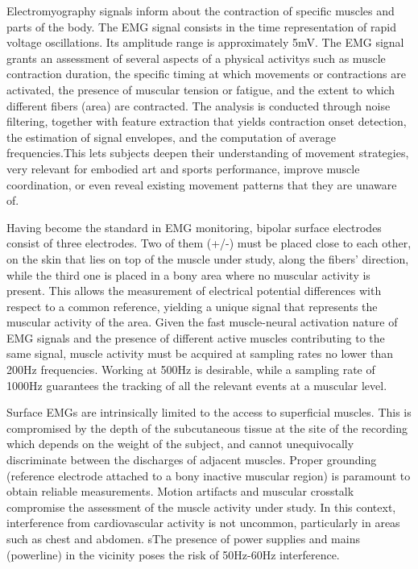 Electromyography signals inform about the contraction of specific muscles and parts of the body. The EMG signal consists in the time representation of rapid voltage oscillations. Its amplitude range is approximately 5mV. The EMG signal grants an assessment of several aspects of a physical activitys such as muscle contraction duration, the specific timing at which movements or contractions are activated, the presence of muscular tension or fatigue, and the extent to which different fibers (area) are contracted. The analysis is conducted through noise filtering, together with feature extraction that yields contraction onset detection, the estimation of signal envelopes, and the computation of average frequencies.This lets subjects deepen their understanding of movement strategies, very relevant for embodied art and sports performance, improve muscle coordination, or even reveal existing movement patterns that they are unaware of.


Having become the standard in EMG monitoring, bipolar surface electrodes consist of three electrodes. Two of them (+/-) must be placed close to each other, on the skin that lies on top of the muscle under study, along the fibers' direction, while the third one is placed in a bony area where no muscular activity is present. This allows the measurement of electrical potential differences with respect to a common reference, yielding a unique signal that represents the muscular activity of the area. Given the fast muscle-neural activation nature of EMG signals and the presence of different active muscles contributing to the same signal, muscle activity must be acquired at sampling rates no lower than 200Hz frequencies. Working at 500Hz is desirable, while a sampling rate of 1000Hz guarantees the tracking of all the relevant events at a muscular level.

Surface EMGs are intrinsically limited to the access to superficial muscles. This is compromised by the depth of the subcutaneous tissue at the site of the recording which depends on the weight of the subject, and cannot unequivocally discriminate between the discharges of adjacent muscles.
Proper grounding (reference electrode attached to a bony inactive muscular region) is paramount to obtain reliable measurements. Motion artifacts and muscular crosstalk compromise the assessment of the muscle activity under study. In this context, interference from cardiovascular activity is not uncommon, particularly in areas such as chest and abdomen. sThe presence of power supplies and mains (powerline) in the vicinity poses the risk of 50Hz-60Hz interference.

